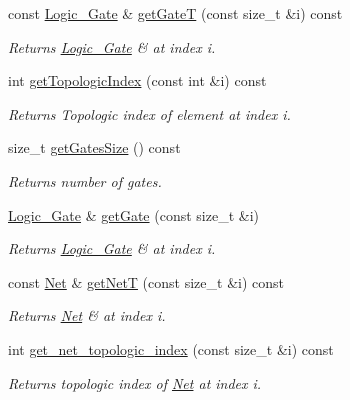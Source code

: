 \begin{DoxyCompactItemize}
const \hyperlink{structCircuit__Netlist_1_1Logic__Gate}{Logic\-\_\-\-Gate} \& \hyperlink{classCircuit__Netlist_a3413fe728fb06a6b5b71be6d676b59de}{get\-Gate\-T} (const size\-\_\-t \&i) const 
\begin{DoxyCompactList}\small\item\em Returns \hyperlink{structCircuit__Netlist_1_1Logic__Gate}{Logic\-\_\-\-Gate} \& at index i. \end{DoxyCompactList}\item 
int \hyperlink{classCircuit__Netlist_a287e1aaee9b917ce7d1192b7c3914009}{get\-Topologic\-Index} (const int \&i) const 
\begin{DoxyCompactList}\small\item\em Returns Topologic index of element at index i. \end{DoxyCompactList}\item 
size\-\_\-t \hyperlink{classCircuit__Netlist_aa0abd4b9e4a774c8baf83a5b1c141e67}{get\-Gates\-Size} () const 
\begin{DoxyCompactList}\small\item\em Returns number of gates. \end{DoxyCompactList}\item 
\hyperlink{structCircuit__Netlist_1_1Logic__Gate}{Logic\-\_\-\-Gate} \& \hyperlink{classCircuit__Netlist_a2c7c0bc6951c71564f8158682678d118}{get\-Gate} (const size\-\_\-t \&i)
\begin{DoxyCompactList}\small\item\em Returns \hyperlink{structCircuit__Netlist_1_1Logic__Gate}{Logic\-\_\-\-Gate} \& at index i. \end{DoxyCompactList}\item 
const \hyperlink{structCircuit__Netlist_1_1Net}{Net} \& \hyperlink{classCircuit__Netlist_a9dfc3ea50ca3a6f87ffac564011b85e2}{get\-Net\-T} (const size\-\_\-t \&i) const 
\begin{DoxyCompactList}\small\item\em Returns \hyperlink{structCircuit__Netlist_1_1Net}{Net} \& at index i. \end{DoxyCompactList}\item 
int \hyperlink{classCircuit__Netlist_a92fd5d0cfc1c5951b5ff1f31dfff2f05}{get\-\_\-net\-\_\-topologic\-\_\-index} (const size\-\_\-t \&i) const 
\begin{DoxyCompactList}\small\item\em Returns topologic index of \hyperlink{structCircuit__Netlist_1_1Net}{Net} at index i. \end{DoxyCompactList}\item 

\end{DoxyCompactItemize}
